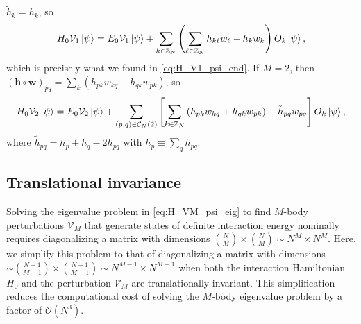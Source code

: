 \documentclass[nofootinbib,notitlepage,11pt]{revtex4-2}
\newcommand{\p}[1]{\left(#1\right)} %
\renewcommand{\sp}[1]{\left[#1\right]} %
\newcommand{\m}{\bm} %
\newcommand{\1}{\mathds{1}}
\newcommand{\C}{\mathcal{C}}
\renewcommand{\O}{\mathcal{O}}
\newcommand{\V}{\mathcal{V}}
\newcommand{\ZZ}{\mathbb{Z}}
\begin{document}
$\tilde h_k=h_k$, so
\begin{align}
  H_0 \V_1 \ket\psi
  = E_0 \V_1 \ket\psi + \sum_{k\in\ZZ_N}
  \p{\sum_{\ell\in\ZZ_N} h_{k\ell} w_\ell - h_k w_k} O_k \ket\psi,
\end{align}
which is precisely what we found in \eqref{eq:H_V1_psi_end}.  If
$M=2$, then
$\p{\m h\circ\m w}_{pq}=\sum_k\p{h_{pk}w_{kq}+h_{qk}w_{pk}}$, so
\begin{align}
  H_0 \V_2 \ket\psi
  = E_0 \V_2 \ket\psi + \sum_{\p{p,q}\in\C_N\p{2}}
  \sp{\sum_{k\in\ZZ_N}\p{h_{pk} w_{kq} + h_{qk} w_{pk}}
    - \tilde h_{pq} w_{pq}}
  O_k \ket\psi,
\end{align}
where $\tilde h_{pq}=h_p+h_q-2h_{pq}$ with $h_p\equiv\sum_qh_{pq}$.

\subsection{Translational invariance}
\label{sec:trans_inv}

Solving the eigenvalue problem in \eqref{eq:H_VM_psi_eig} to find
$M$-body perturbations $\V_M$ that generate states of definite
interaction energy nominally requires diagonalizing a matrix with
dimensions ${N\choose M}\times{N\choose M}\sim N^M\times N^M$.  Here,
we simplify this problem to that of diagonalizing a matrix with
dimensions
$\sim{N-1\choose M-1}\times{N-1\choose M-1}\sim N^{M-1}\times N^{M-1}$
when both the interaction Hamiltonian $H_0$ and the perturbation
$\V_M$ are translationally invariant.  This simplification reduces the
computational cost of solving the $M$-body eigenvalue problem by a
factor of $\O\p{N^3}$.
\end{document}
